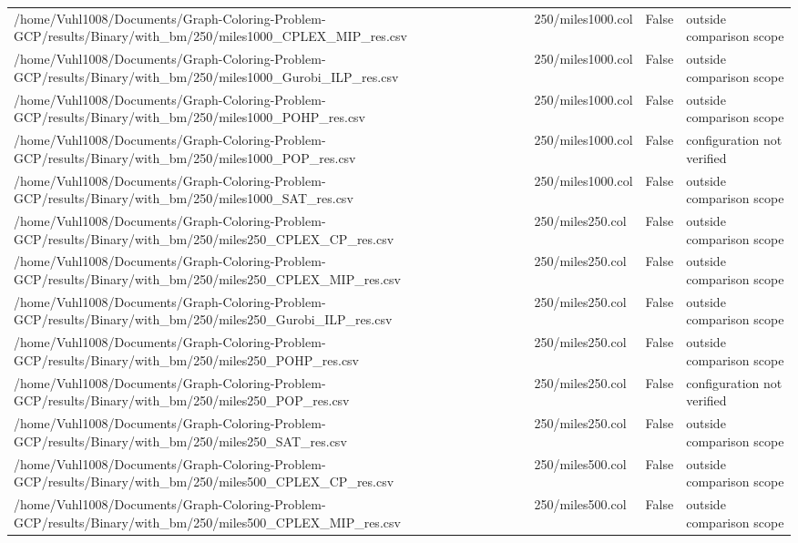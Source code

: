 \begin{table}[htbp]
\begin{tabular}{llll}
/home/Vuhl1008/Documents/Graph-Coloring-Problem-GCP/results/Binary/with\_bm/250/miles1000\_CPLEX\_MIP\_res.csv & 250/miles1000.col & False & outside comparison scope \\
/home/Vuhl1008/Documents/Graph-Coloring-Problem-GCP/results/Binary/with\_bm/250/miles1000\_Gurobi\_ILP\_res.csv & 250/miles1000.col & False & outside comparison scope \\
/home/Vuhl1008/Documents/Graph-Coloring-Problem-GCP/results/Binary/with\_bm/250/miles1000\_POHP\_res.csv & 250/miles1000.col & False & outside comparison scope \\
/home/Vuhl1008/Documents/Graph-Coloring-Problem-GCP/results/Binary/with\_bm/250/miles1000\_POP\_res.csv & 250/miles1000.col & False & configuration not verified \\
/home/Vuhl1008/Documents/Graph-Coloring-Problem-GCP/results/Binary/with\_bm/250/miles1000\_SAT\_res.csv & 250/miles1000.col & False & outside comparison scope \\
/home/Vuhl1008/Documents/Graph-Coloring-Problem-GCP/results/Binary/with\_bm/250/miles250\_CPLEX\_CP\_res.csv & 250/miles250.col & False & outside comparison scope \\
/home/Vuhl1008/Documents/Graph-Coloring-Problem-GCP/results/Binary/with\_bm/250/miles250\_CPLEX\_MIP\_res.csv & 250/miles250.col & False & outside comparison scope \\
/home/Vuhl1008/Documents/Graph-Coloring-Problem-GCP/results/Binary/with\_bm/250/miles250\_Gurobi\_ILP\_res.csv & 250/miles250.col & False & outside comparison scope \\
/home/Vuhl1008/Documents/Graph-Coloring-Problem-GCP/results/Binary/with\_bm/250/miles250\_POHP\_res.csv & 250/miles250.col & False & outside comparison scope \\
/home/Vuhl1008/Documents/Graph-Coloring-Problem-GCP/results/Binary/with\_bm/250/miles250\_POP\_res.csv & 250/miles250.col & False & configuration not verified \\
/home/Vuhl1008/Documents/Graph-Coloring-Problem-GCP/results/Binary/with\_bm/250/miles250\_SAT\_res.csv & 250/miles250.col & False & outside comparison scope \\
/home/Vuhl1008/Documents/Graph-Coloring-Problem-GCP/results/Binary/with\_bm/250/miles500\_CPLEX\_CP\_res.csv & 250/miles500.col & False & outside comparison scope \\
/home/Vuhl1008/Documents/Graph-Coloring-Problem-GCP/results/Binary/with\_bm/250/miles500\_CPLEX\_MIP\_res.csv & 250/miles500.col & False & outside comparison scope \\

\end{tabular}
\end{table}
